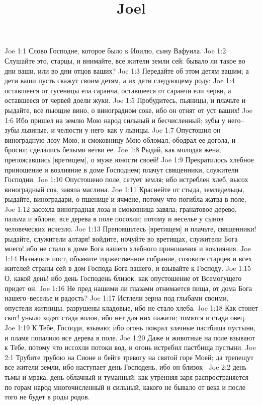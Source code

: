 

\title{Joel}

Joe 1:1  Слово Господне, которое было к Иоилю, сыну Вафуила.
Joe 1:2  Слушайте это, старцы, и внимайте, все жители земли сей: бывало ли такое во дни ваши, или во дни отцов ваших?
Joe 1:3  Передайте об этом детям вашим; а дети ваши пусть скажут своим детям, а их дети следующему роду:
Joe 1:4  оставшееся от гусеницы ела саранча, оставшееся от саранчи ели черви, а оставшееся от червей доели жуки.
Joe 1:5  Пробудитесь, пьяницы, и плачьте и рыдайте, все пьющие вино, о виноградном соке, ибо он отнят от уст ваших!
Joe 1:6  Ибо пришел на землю Мою народ сильный и бесчисленный; зубы у него--зубы львиные, и челюсти у него--как у львицы.
Joe 1:7  Опустошил он виноградную лозу Мою, и смоковницу Мою обломал, ободрал ее догола, и бросил; сделались белыми ветви ее.
Joe 1:8  Рыдай, как молодая жена, препоясавшись [вретищем], о муже юности своей!
Joe 1:9  Прекратилось хлебное приношение и возлияние в доме Господнем; плачут священники, служители Господни.
Joe 1:10  Опустошено поле, сетует земля; ибо истреблен хлеб, высох виноградный сок, завяла маслина.
Joe 1:11  Краснейте от стыда, земледельцы, рыдайте, виноградари, о пшенице и ячмене, потому что погибла жатва в поле,
Joe 1:12  засохла виноградная лоза и смоковница завяла; гранатовое дерево, пальма и яблоня, все дерева в поле посохли; потому и веселье у сынов человеческих исчезло.
Joe 1:13  Препояшьтесь [вретищем] и плачьте, священники! рыдайте, служители алтаря! войдите, ночуйте во вретищах, служители Бога моего! ибо не стало в доме Бога вашего хлебного приношения и возлияния.
Joe 1:14  Назначьте пост, объявите торжественное собрание, созовите старцев и всех жителей страны сей в дом Господа Бога вашего, и взывайте к Господу.
Joe 1:15  О, какой день! ибо день Господень близок; как опустошение от Всемогущего придет он.
Joe 1:16  Не пред нашими ли глазами отнимается пища, от дома Бога нашего--веселье и радость?
Joe 1:17  Истлели зерна под глыбами своими, опустели житницы, разрушены кладовые, ибо не стало хлеба.
Joe 1:18  Как стонет скот! уныло ходят стада волов, ибо нет для них пажити; томятся и стада овец.
Joe 1:19  К Тебе, Господи, взываю; ибо огонь пожрал злачные пастбища пустыни, и пламя попалило все дерева в поле.
Joe 1:20  Даже и животные на поле взывают к Тебе, потому что иссохли потоки вод, и огонь истребил пастбища пустыни.
Joe 2:1  Трубите трубою на Сионе и бейте тревогу на святой горе Моей; да трепещут все жители земли, ибо наступает день Господень, ибо он близок--
Joe 2:2  день тьмы и мрака, день облачный и туманный: как утренняя заря распространяется по горам народ многочисленный и сильный, какого не бывало от века и после того не будет в роды родов.
